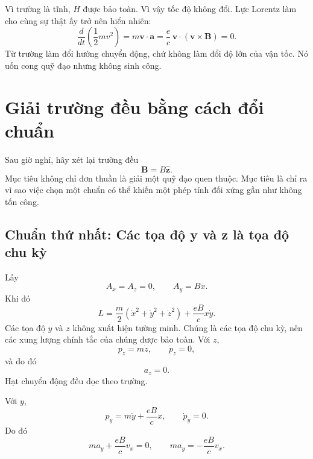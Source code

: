 Vì trường là tĩnh, \(H\) được bảo toàn. Vì vậy tốc độ không đổi. Lực Lorentz làm cho cùng sự thật ấy trở nên hiển nhiên:
\begin{equation}
  \frac{d}{dt}\left(\frac12mv^2\right)
  =
  m\mathbf v\cdot\mathbf a
  =
  \frac{e}{c}\,
  \mathbf v\cdot(\mathbf v\times\mathbf B)
  =0.
\end{equation}
Từ trường làm đổi hướng chuyển động, chứ không làm đổi độ lớn của vận tốc. Nó uốn cong quỹ đạo nhưng không sinh công.

\section{Giải trường đều bằng cách đổi chuẩn}

Sau giờ nghỉ, hãy xét lại trường đều
\begin{equation}
  \mathbf B=B\hat{\mathbf z}.
\end{equation}
Mục tiêu không chỉ đơn thuần là giải một quỹ đạo quen thuộc. Mục tiêu là chỉ ra vì sao việc chọn một chuẩn có thể khiến một phép tính đối xứng gần như không tốn công.

\subsection{Chuẩn thứ nhất: Các tọa độ y và z là tọa độ chu kỳ}

Lấy
\begin{equation}
  A_x=A_z=0,
  \qquad
  A_y=Bx.
\end{equation}
Khi đó
\begin{equation}
  L
  =
  \frac{m}{2}
  \left(\dot x^2+\dot y^2+\dot z^2\right)
  +
  \frac{eB}{c}x\dot y.
\end{equation}
Các tọa độ \(y\) và \(z\) không xuất hiện tường minh. Chúng là các tọa độ chu kỳ, nên các xung lượng chính tắc của chúng được bảo toàn. Với \(z\),
\begin{equation}
  p_z=m\dot z,
  \qquad
  \dot p_z=0,
\end{equation}
và do đó
\begin{equation}
  a_z=0.
\end{equation}
Hạt chuyển động đều dọc theo trường.

Với \(y\),
\begin{equation}
  p_y=m\dot y+\frac{eB}{c}x,
  \qquad
  \dot p_y=0.
\end{equation}
Do đó
\begin{equation}
  m a_y+\frac{eB}{c}v_x=0,
  \qquad
  \boxed{m a_y=-\frac{eB}{c}v_x}.
\end{equation}


